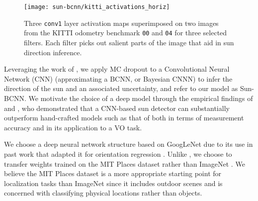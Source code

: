 \begin{figure}
    \centering
    \texttt{[image: sun-bcnn/kitti\_activations\_horiz]}
    \caption{Three \texttt{conv1} layer activation maps superimposed on two images from the KITTI odometry benchmark \citep{Geiger2013-ky} \texttt{00} and \texttt{04} for three selected filters. Each filter picks out salient parts of the image that aid in sun direction inference.}
    \label{fig:sun-bcnn_kitti_cnn_activations}
\end{figure}

Leveraging the work of \cite{Gal2016CNN}, we apply MC dropout to a Convolutional Neural Network (CNN) (approximating a BCNN, or Bayesian CNNN) to infer the direction of the sun and an associated uncertainty, and refer to our model as Sun-BCNN. 
We motivate the choice of a deep model through the empirical findings of \citet{2017_Clement_Improving} and \citet{Ma2016-at}, who demonstrated that a CNN-based sun detector can substantially outperform hand-crafted models such as that of \citet{Lalonde2011-jw} both in terms of measurement accuracy and in its application to a VO task.

We choose a deep neural network structure based on GoogLeNet \citep{Szegedy2015-uw} due to its use in past work that adapted it for orientation regression \citep{Kendall2016-zf,Kendall2015-ew}. 
Unlike \citet{Ma2016-at}, we choose to transfer weights trained on the MIT Places dataset \citep{zhou2014MITPlaces} rather than ImageNet \citep{deng2009imagenet}.
We believe the MIT Places dataset is a more appropriate starting point for localization tasks than ImageNet since it includes outdoor scenes and is concerned with classifying physical locations rather than objects.

